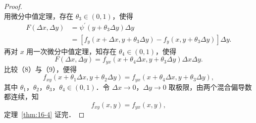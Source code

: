 \begin{proof}
\[\]
用微分中值定理，存在 $\theta_{3}\in(0,1)$，使得
\[
\begin{aligned}
F(\Delta x,\Delta y)&=\psi^{\prime}(y+\theta_{3}\Delta y)\Delta y\\
&=\left[f_{y}(x+\Delta x,y+\theta_{3}\Delta y)-f_{y}(x,y+\theta_{3}\Delta y)\right]\Delta y.
\end{aligned}
\]
再对 $x$ 用一次微分中值定理，知存在 $\theta_{4}\in(0,1)$，使得
\begin{equation}
F(\Delta x,\Delta y)=f_{yx}(x+\theta_{4}\Delta x,y+\theta_{3}\Delta y)\Delta x\Delta y.
\tag{9}
\end{equation}
比较（8）与（9），便得
\[
f_{xy}(x+\theta_{1}\Delta x,y+\theta_{2}\Delta y)=f_{yx}(x+\theta_{4}\Delta x,y+\theta_{3}\Delta y),
\]
其中 $\theta_{1}$，$\theta_{2}$，$\theta_{3}$，$\theta_{4}\in(0,1)$．令 $\Delta x\to 0$，$\Delta y\to 0$ 取极限，由两个混合偏导数都连续，知
\[
f_{xy}(x,y)=f_{yx}(x,y),
\]
定理~\ref{thm:16-4} 证完．
\end{proof}

